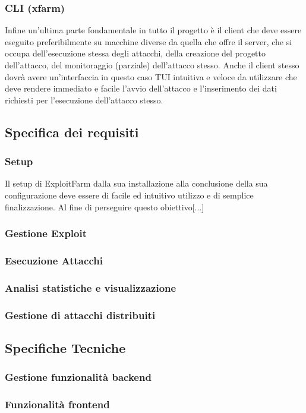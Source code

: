 \documentclass[11pt]{article}
\begin{document}
\subsubsection{CLI (xfarm)}
Infine un'ultima parte fondamentale in tutto il progetto è il client che deve essere eseguito preferibilmente su macchine diverse da quella che offre il server, che si occupa dell'esecuzione stessa degli attacchi, della creazione del progetto dell'attacco, del monitoraggio (parziale) dell'attacco stesso. Anche il client stesso dovrà avere un'interfaccia in questo caso TUI intuitiva e veloce da utilizzare che deve rendere immediato e facile l'avvio dell'attacco e l'inserimento dei dati richiesti per l'esecuzione dell'attacco stesso.
\subsection{Specifica dei requisiti}
\subsubsection{Setup}
Il setup di ExploitFarm dalla sua installazione alla conclusione della sua configurazione deve essere di facile ed intuitivo utilizzo e di semplice finalizzazione. Al fine di perseguire questo obiettivo[...]
\subsubsection{Gestione Exploit}
\subsubsection{Esecuzione Attacchi}
\subsubsection{Analisi statistiche e visualizzazione}
\subsubsection{Gestione di attacchi distribuiti}
\subsection{Specifiche Tecniche}
\subsubsection{Gestione funzionalità backend}
\subsubsection{Funzionalità frontend}
\end{document}
